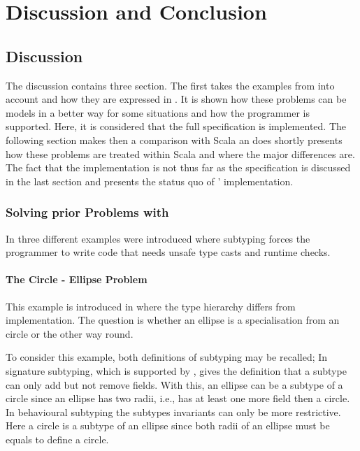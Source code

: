 \chapter{Discussion and Conclusion}
\label{ctr:discussionConclusion}
\section{Discussion}
\label{ctr:discussion}
The discussion contains three section. The first takes the examples from
 into account and how they are expressed
in \ooplss. It is shown how these problems can be models in a better
way for some situations and how the programmer is supported. Here, it
is considered that the full specification is implemented. The following
section makes then a comparison with Scala an does shortly presents how
these problems are treated within Scala and where the major differences
are. The fact that the implementation is not thus far as the specification
is discussed in the last section and presents the status quo of \ooplss'
implementation.

\subsection{Solving prior Problems with \ooplss}
In  three different examples were
introduced where subtyping forces the programmer to write code that
needs unsafe type casts and runtime checks.

\subsubsection{The Circle - Ellipse Problem}
This example is introduced in  where the type
hierarchy differs from implementation. The question is whether an ellipse
is a specialisation from an circle or the other way round.

To consider this example, both definitions of subtyping may be recalled;
In signature subtyping, which is supported by \ooplss, gives the
definition that a subtype can only add but not remove fields. With this,
an ellipse can be a subtype of a circle since an ellipse has two radii,
i.e., has at least one more field then a circle. In behavioural subtyping
the subtypes invariants can only be more restrictive. Here a circle is
a subtype of an ellipse since both radii of an ellipse must be equals
to define a circle.


